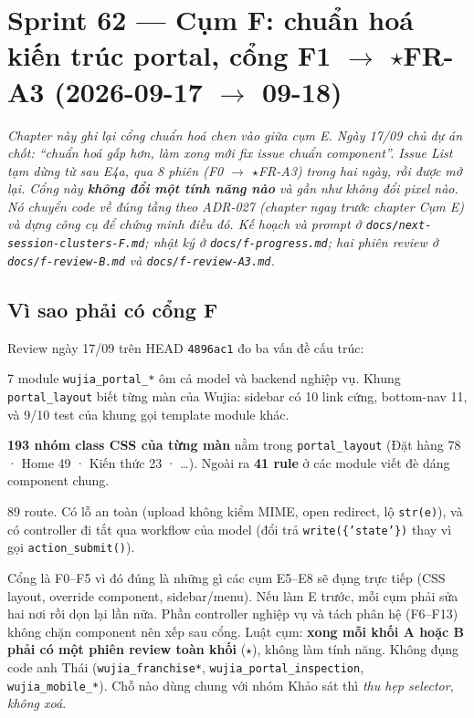 \chapter{Sprint 62 --- Cụm F: chuẩn hoá kiến trúc portal, cổng F1 $\to$ $\star$FR-A3 (2026-09-17 $\to$ 09-18)}

\emph{Chapter này ghi lại cổng chuẩn hoá chen vào giữa cụm E. Ngày 17/09 chủ dự án chốt: \emph{``chuẩn hoá
gấp hơn, làm xong mới fix issue chuẩn component''}. Issue List tạm dừng từ sau E4a, qua 8 phiên
(F0 $\to$ $\star$FR-A3) trong hai ngày, rồi được mở lại. Cổng này \textbf{không đổi một tính năng
nào} và gần như không đổi pixel nào. Nó chuyển code về đúng tầng theo ADR-027 (chapter ngay trước chapter Cụm E) và
dựng công cụ để chứng minh điều đó. Kế hoạch và prompt ở \texttt{docs/next-session-clusters-F.md};
nhật ký ở \texttt{docs/f-progress.md}; hai phiên review ở \texttt{docs/f-review-B.md} và
\texttt{docs/f-review-A3.md}.}

\section{Vì sao phải có cổng F}

Review ngày 17/09 trên HEAD \texttt{4896ac1} đo ba vấn đề cấu trúc:
\begin{description}[nosep]
\item[A --- Chia vai trò module.] 7 module \texttt{wujia\_portal\_*} ôm cả model và backend nghiệp vụ.
  Khung \texttt{portal\_layout} biết từng màn của Wujia: sidebar có 10 link cứng, bottom-nav 11, và 9/10
  test của khung gọi template module khác.
\item[B --- Component.] \textbf{193 nhóm class CSS của từng màn} nằm trong \texttt{portal\_layout} (Đặt hàng 78 ·
  Home 49 · Kiến thức 23 · …). Ngoài ra \textbf{41 rule} ở các module viết đè dáng component chung.
\item[C --- Controller.] 89 route. Có lỗ an toàn (upload không kiểm MIME, open redirect, lộ \texttt{str(e)}),
  và có controller đi tắt qua workflow của model (đổi trả \texttt{write(\{'state'\})} thay vì gọi
  \texttt{action\_submit()}).
\end{description}

Cổng là F0--F5 vì đó đúng là những gì các cụm E5--E8 sẽ đụng trực tiếp (CSS layout, override
component, sidebar/menu). Nếu làm E trước, mỗi cụm phải sửa hai nơi rồi dọn lại lần nữa. Phần
controller nghiệp vụ và tách phân hệ (F6--F13) không chặn component nên xếp sau cổng. Luật cụm:
\textbf{xong mỗi khối A hoặc B phải có một phiên review toàn khối} ($\star$), không làm tính năng. Không
đụng code anh Thái (\texttt{wujia\_franchise*}, \texttt{wujia\_portal\_inspection}, \texttt{wujia\_mobile\_*}).
Chỗ nào dùng chung với nhóm Khảo sát thì \emph{thu hẹp selector, không xoá}.

